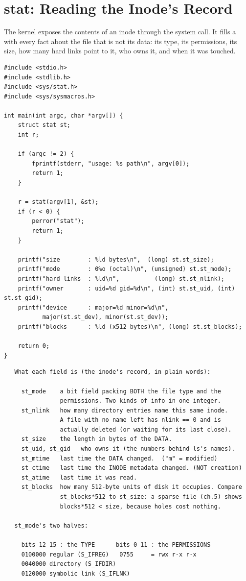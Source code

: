 \section{stat: Reading the Inode's Record}

The kernel exposes the contents of an inode through the 
system call. It fills a  with every fact about the
file that is not its data: its type, its permissions, its size, how
many hard links point to it, who owns it, and when it was touched.

\begin{lstlisting}[caption={stat: dump the metadata of a path.}]
#include <stdio.h>
#include <stdlib.h>
#include <sys/stat.h>
#include <sys/sysmacros.h>

int main(int argc, char *argv[]) {
    struct stat st;
    int r;

    if (argc != 2) {
        fprintf(stderr, "usage: %s path\n", argv[0]);
        return 1;
    }

    r = stat(argv[1], &st);
    if (r < 0) {
        perror("stat");
        return 1;
    }

    printf("size        : %ld bytes\n",  (long) st.st_size);
    printf("mode        : 0%o (octal)\n", (unsigned) st.st_mode);
    printf("hard links  : %ld\n",          (long) st.st_nlink);
    printf("owner       : uid=%d gid=%d\n", (int) st.st_uid, (int) st.st_gid);
    printf("device      : major=%d minor=%d\n",
           major(st.st_dev), minor(st.st_dev));
    printf("blocks      : %ld (x512 bytes)\n", (long) st.st_blocks);

    return 0;
}
\end{lstlisting}

\begin{verbatim}
   What each field is (the inode's record, in plain words):

     st_mode    a bit field packing BOTH the file type and the
                permissions. Two kinds of info in one integer.
     st_nlink   how many directory entries name this same inode.
                A file with no name left has nlink == 0 and is
                actually deleted (or waiting for its last close).
     st_size    the length in bytes of the DATA.
     st_uid, st_gid   who owns it (the numbers behind ls's names).
     st_mtime   last time the DATA changed.  ("m" = modified)
     st_ctime   last time the INODE metadata changed. (NOT creation)
     st_atime   last time it was read.
     st_blocks  how many 512-byte units of disk it occupies. Compare
                st_blocks*512 to st_size: a sparse file (ch.5) shows
                blocks*512 < size, because holes cost nothing.

   st_mode's two halves:

     bits 12-15 : the TYPE      bits 0-11 : the PERMISSIONS
     0100000 regular (S_IFREG)   0755     = rwx r-x r-x
     0040000 directory (S_IFDIR)
     0120000 symbolic link (S_IFLNK)
\end{verbatim}

